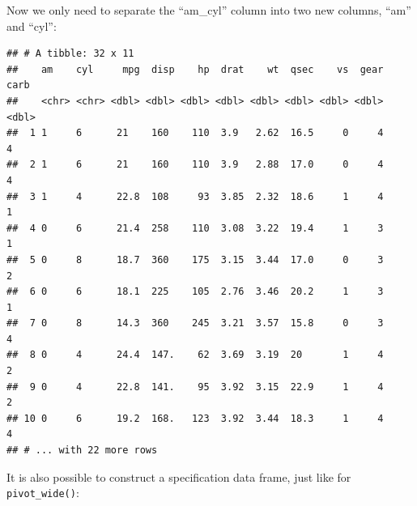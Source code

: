 \documentclass[]{gitbook}
\newenvironment{Shaded}{\begin{snugshade}}{\end{snugshade}}
\newcommand{\DataTypeTok}[1]{\textcolor[rgb]{0.13,0.29,0.53}{#1}}
\newcommand{\KeywordTok}[1]{\textcolor[rgb]{0.13,0.29,0.53}{\textbf{#1}}}
\newcommand{\NormalTok}[1]{#1}
\newcommand{\OperatorTok}[1]{\textcolor[rgb]{0.81,0.36,0.00}{\textbf{#1}}}
\newcommand{\OtherTok}[1]{\textcolor[rgb]{0.56,0.35,0.01}{#1}}
\newcommand{\StringTok}[1]{\textcolor[rgb]{0.31,0.60,0.02}{#1}}
\begin{document}
Now we only need to separate the ``am\_cyl'' column into two new columns, ``am'' and ``cyl'':

\begin{Shaded}
\end{Shaded}

\begin{verbatim}
## # A tibble: 32 x 11
##    am    cyl     mpg  disp    hp  drat    wt  qsec    vs  gear  carb
##    <chr> <chr> <dbl> <dbl> <dbl> <dbl> <dbl> <dbl> <dbl> <dbl> <dbl>
##  1 1     6      21    160    110  3.9   2.62  16.5     0     4     4
##  2 1     6      21    160    110  3.9   2.88  17.0     0     4     4
##  3 1     4      22.8  108     93  3.85  2.32  18.6     1     4     1
##  4 0     6      21.4  258    110  3.08  3.22  19.4     1     3     1
##  5 0     8      18.7  360    175  3.15  3.44  17.0     0     3     2
##  6 0     6      18.1  225    105  2.76  3.46  20.2     1     3     1
##  7 0     8      14.3  360    245  3.21  3.57  15.8     0     3     4
##  8 0     4      24.4  147.    62  3.69  3.19  20       1     4     2
##  9 0     4      22.8  141.    95  3.92  3.15  22.9     1     4     2
## 10 0     6      19.2  168.   123  3.92  3.44  18.3     1     4     4
## # ... with 22 more rows
\end{verbatim}

It is also possible to construct a specification data frame, just like for \texttt{pivot\_wide()}:

\begin{Shaded}
\end{Shaded}
\end{document}
